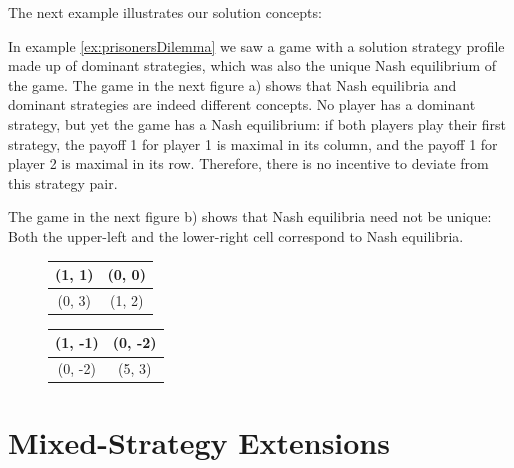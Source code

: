 \documentclass[a4paper]{scrreprt}
\begin{document}
    The next example illustrates our solution concepts:
    
    \begin{ex}
        In example \ref{ex:prisonersDilemma} we saw a game with a solution strategy profile made up of dominant strategies, which was also the unique Nash equilibrium of the game.
        The game in 
        the next figure a) %
        shows that Nash equilibria and dominant strategies are indeed different concepts. No player has a dominant strategy, but yet the game has a Nash equilibrium: if both players play their first strategy, the payoff 1 for player 1 is maximal in its column, and the payoff 1 for player 2 is maximal in its row. Therefore, there is no incentive to deviate from this strategy pair.
        
        The game in
        the next figure b) %
        shows that Nash equilibria need not be unique: Both the upper-left and the lower-right cell correspond to Nash equilibria.
        
        \begin{figure}[h]
            \centering
            \begin{tabular}{|c|c|}
                \hline
                (1, 1) & (0, 0) \\ 
                \hline
                (0, 3) & (1, 2) \\
                \hline
            \end{tabular}
            \begin{tabular}{|c|c|}
                \hline
                (1, -1) & (0, -2) \\ 
                \hline
                (0, -2) & (5, 3) \\
                \hline
            \end{tabular}
        \end{figure}
    \end{ex}
    
    \section{Mixed-Strategy Extensions}
    
\end{document}
